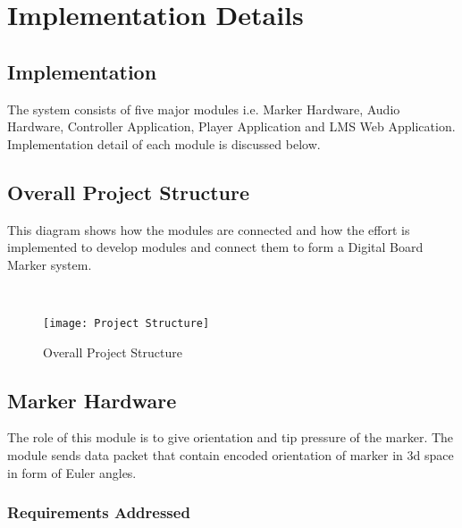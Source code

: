 
\chapter{Implementation Details} %
\label{Chapter4}

\section{Implementation}
The system consists of five major modules i.e. Marker Hardware, Audio Hardware, Controller Application, Player Application and LMS Web Application. Implementation detail of each module is discussed below.


\section{Overall Project Structure}
This diagram shows how the modules are connected and how the effort is implemented to develop modules and connect them to form a Digital Board Marker system.

\mbox{}\\

\begin{figure}[h]
  \centering
  \texttt{[image: Project Structure]}
  \caption{Overall Project Structure}
\end{figure}
\newpage
\section{Marker Hardware}
The role of this module is to give orientation and tip pressure of the marker. The module sends data packet that contain encoded orientation of marker in 3d space in form of Euler angles.

\subsection{Requirements Addressed}


